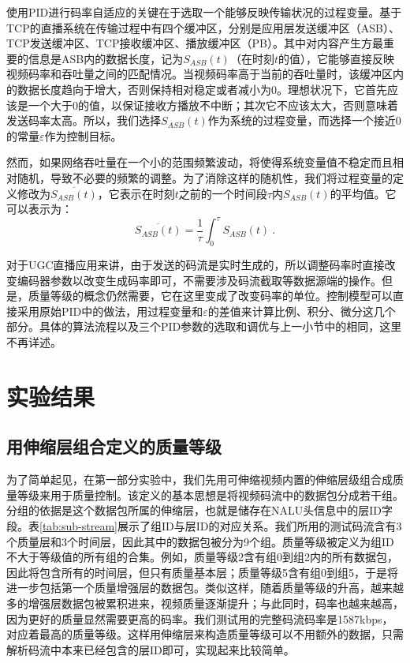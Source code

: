 使用PID进行码率自适应的关键在于选取一个能够反映传输状况的过程变量。基于TCP的直播系统在传输过程中有四个缓冲区，分别是应用层发送缓冲区（ASB）、TCP发送缓冲区、TCP接收缓冲区、播放缓冲区（PB）。其中对内容产生方最重要的信息是ASB内的数据长度，记为$S_{ASB}(t)$（在时刻$t$的值），它能够直接反映视频码率和吞吐量之间的匹配情况。当视频码率高于当前的吞吐量时，该缓冲区内的数据长度趋向于增大，否则保持相对稳定或者减小为0。理想状况下，它首先应该是一个大于0的值，以保证接收方播放不中断；其次它不应该太大，否则意味着发送码率太高。所以，我们选择$S_{ASB}(t)$作为系统的过程变量，而选择一个接近0的常量$\varepsilon$作为控制目标。

然而，如果网络吞吐量在一个小的范围频繁波动，将使得系统变量值不稳定而且相对随机，导致不必要的频繁的调整。为了消除这样的随机性，我们将过程变量的定义修改为$\overline{S_{ASB}(t)}$，它表示在时刻$t$之前的一个时间段$\tau$内$S_{ASB}(t)$的平均值。它可以表示为：
\begin{equation}
\label{eq:asb}
\overline{S_{ASB}(t)} = \dfrac{1}{\tau} \int_0^\tau {S_{ASB}(t)}\: .
\end{equation}

对于UGC直播应用来讲，由于发送的码流是实时生成的，所以调整码率时直接改变编码器参数以改变生成码率即可，不需要涉及码流截取等数据源端的操作。但是，质量等级的概念仍然需要，它在这里变成了改变码率的单位。控制模型可以直接采用原始PID中的做法，用过程变量和$\varepsilon$的差值来计算比例、积分、微分这几个部分。具体的算法流程以及三个PID参数的选取和调优与上一小节中的相同，这里不再详述。

\section{实验结果}

\subsection{用伸缩层组合定义的质量等级}

为了简单起见，在第一部分实验中，我们先用可伸缩视频内置的伸缩层级组合成质量等级来用于质量控制。该定义的基本思想是将视频码流中的数据包分成若干组。分组的依据是这个数据包所属的伸缩层，也就是储存在NALU头信息中的层ID字段。表\ref{tab:sub-stream}展示了组ID与层ID的对应关系。我们所用的测试码流含有3个质量层和3个时间层，因此其中的数据包被分为9个组。质量等级被定义为组ID不大于等级值的所有组的合集。例如，质量等级2含有组0到组2内的所有数据包，因此将包含所有的时间层，但只有质量基本层；质量等级5含有组0到组5，于是将进一步包括第一个质量增强层的数据包。类似这样，随着质量等级的升高，越来越多的增强层数据包被累积进来，视频质量逐渐提升；与此同时，码率也越来越高，因为更好的质量显然需要更高的码率。我们测试用的完整码流码率是1587kbps，对应着最高的质量等级。这样用伸缩层来构造质量等级可以不用额外的数据，只需解析码流中本来已经包含的层ID即可，实现起来比较简单。

